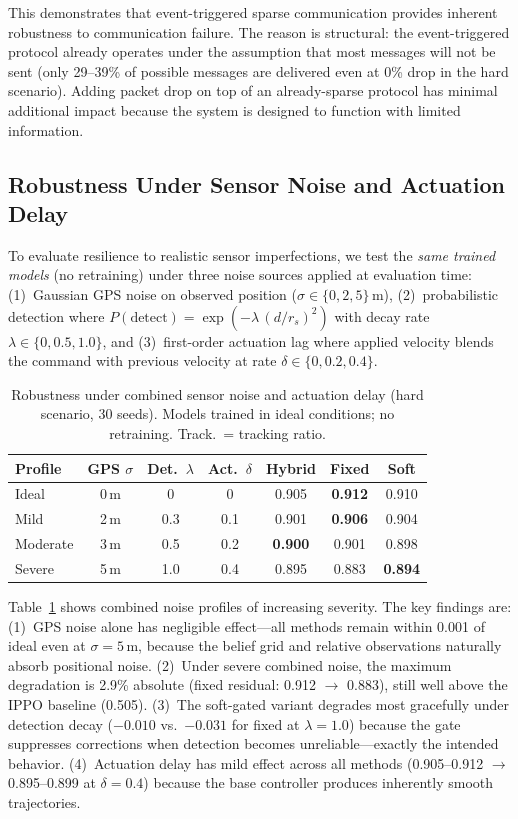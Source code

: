 \documentclass[journal]{IEEEtran}
\begin{document}
This demonstrates that event-triggered sparse communication provides inherent
robustness to communication failure. The reason is structural: the event-triggered
protocol already operates under the assumption that most messages will not be sent
(only 29--39\% of possible messages are delivered even at 0\% drop in the hard
scenario). Adding packet drop on top of an already-sparse protocol has minimal
additional impact because the system is designed to function with limited information.

\subsection{Robustness Under Sensor Noise and Actuation Delay}
\label{sec:sensor_noise}

To evaluate resilience to realistic sensor imperfections, we test the \emph{same
trained models} (no retraining) under three noise sources applied at evaluation time:
(1)~Gaussian GPS noise on observed position ($\sigma \in \{0, 2, 5\}$\,m),
(2)~probabilistic detection where $P(\text{detect}) = \exp(-\lambda\,(d/r_s)^2)$
with decay rate $\lambda \in \{0, 0.5, 1.0\}$, and (3)~first-order actuation lag
where applied velocity blends the command with previous velocity at rate
$\delta \in \{0, 0.2, 0.4\}$.

\begin{table}[t]
\centering
\caption{Robustness under combined sensor noise and actuation delay (hard scenario,
30 seeds). Models trained in ideal conditions; no retraining. Track.\ = tracking ratio.}
\label{tab:sensor_noise}
\scriptsize
\setlength{\tabcolsep}{3pt}
\begin{tabular}{@{}lcccccc@{}}
\toprule
Profile & GPS $\sigma$ & Det.\ $\lambda$ & Act.\ $\delta$ & Hybrid & Fixed & Soft \\
\midrule
Ideal    & 0\,m & 0   & 0   & 0.905 & \textbf{0.912} & 0.910 \\
Mild     & 2\,m & 0.3 & 0.1 & 0.901 & \textbf{0.906} & 0.904 \\
Moderate & 3\,m & 0.5 & 0.2 & \textbf{0.900} & 0.901 & 0.898 \\
Severe   & 5\,m & 1.0 & 0.4 & 0.895 & 0.883 & \textbf{0.894} \\
\bottomrule
\end{tabular}
\end{table}

Table~\ref{tab:sensor_noise} shows combined noise profiles of increasing severity.
The key findings are: (1)~GPS noise alone has negligible effect---all methods remain
within 0.001 of ideal even at $\sigma = 5$\,m, because the belief grid and relative
observations naturally absorb positional noise. (2)~Under severe combined noise, the
maximum degradation is 2.9\% absolute (fixed residual: 0.912 $\to$ 0.883), still well
above the IPPO baseline (0.505). (3)~The soft-gated variant degrades most gracefully
under detection decay ($-0.010$ vs.\ $-0.031$ for fixed at $\lambda=1.0$) because the
gate suppresses corrections when detection becomes unreliable---exactly the intended
behavior. (4)~Actuation delay has mild effect across all methods (0.905--0.912
$\to$ 0.895--0.899 at $\delta=0.4$) because the base controller produces inherently
smooth trajectories.
\end{document}
